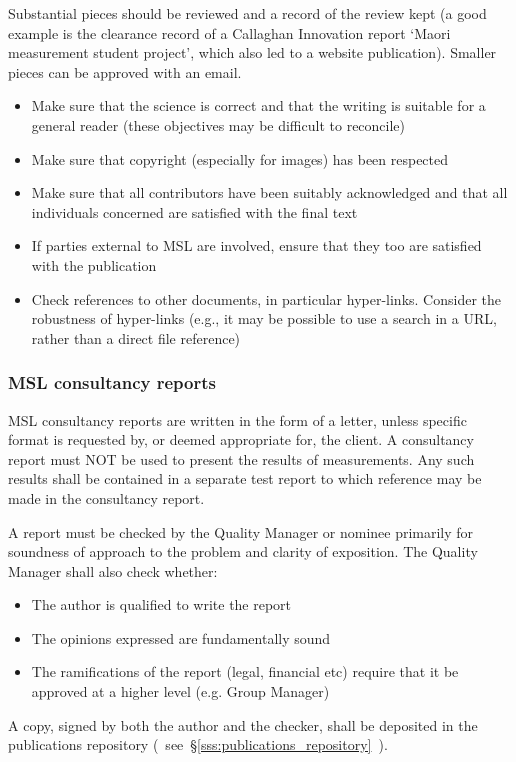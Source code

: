 Substantial pieces should be reviewed and a record of the review kept (a good example is the clearance record of a Callaghan Innovation report `Maori measurement student project', which also led to a website publication). Smaller pieces can be approved with an email.

\begin{itemize}
\item Make sure that the science is correct and that the writing is suitable for a general reader (these objectives may be difficult to reconcile)
\item Make sure that copyright (especially for images) has been respected
\item Make sure that all contributors have been suitably acknowledged and that all individuals concerned are satisfied with the final text 
\item If parties external to MSL are involved, ensure that they too are satisfied with the publication
\item Check references to other documents, in particular hyper-links. Consider the robustness of hyper-links (e.g., it may be possible to use a search in a URL, rather than a direct file reference) 
\end{itemize}
\subsubsection{MSL consultancy reports}
MSL consultancy reports are written in the form of a letter, unless specific format is requested by, or deemed appropriate for, the client.
A consultancy report must NOT be used to present the results of measurements. Any such results shall be contained in a separate test report to which reference may be made in the consultancy report.

A report must be checked by the Quality Manager or nominee primarily for soundness of approach to the problem and clarity of exposition. The Quality Manager shall also check whether: 
\begin{itemize}
\item  The author is qualified to write the report
\item  The opinions expressed are fundamentally sound
\item  The ramifications of the report (legal, financial etc) require that it be approved at a higher level (e.g. Group Manager)
\end{itemize}
A copy, signed by both the author and the checker, shall be deposited in the publications repository (~see~\S\ref{sss:publications_repository}~). 


